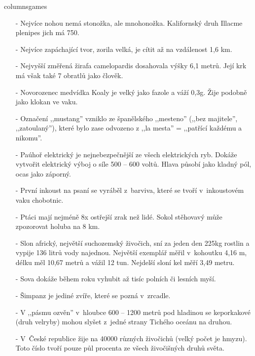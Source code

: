 \begin{multicols}{\value{columnsgames}columnsgames}
\begin{itemize}
\item[-] Nejvíce nohou nemá stonožka, ale mnohonožka. Kalifornský 
druh Illacme plenipes jich má 750.

\item[-] Nejvíce zapáchající tvor, zorila velká, je cítit až na vzdálenost 
1,6 km.

\item[-] Nejvyšší změřená žirafa camelopardis dosahovala výšky 6,1 metrů. 
Její krk má však také 7 obratlů jako člověk.

\item[-] Novorozenec medvídka Koaly je velký jako fazole a váží 0,3g. 
Žije podobně jako klokan ve vaku.

\item[-] Označení ,,mustang'' vzniklo ze španělského ,,mesteno'' (,,bez 
majitele'', ,,zatoulaný''), které bylo zase odvozeno z ,,la mesta'' 
= ,,patřící každému a nikomu''.

\item[-] Paúhoř elektrický je nejnebezpečnější ze všech elektrických ryb. 
Dokáže vytvořit elektrický výboj o síle 500 -- 600 voltů. Hlava 
působí jako kladný pól, ocas jako záporný.

\item[-] První inkoust na psaní se vyráběl z~barviva, které se 
tvoří v~inkoustovém vaku chobotnic.

\item[-] Ptáci mají nejméně 8x ostřejší zrak než lidé. Sokol stěhovavý 
může zpozorovat holuba na 8 km.

\item[-] Slon africký, největší suchozemský živočich, sní za jeden den 
225kg rostlin a vypije 136 litrů vody najednou. Největší exemplář 
měřil v~kohoutku 4,16 m, délku měl 10,67 metrů a vážil 
12 tun. Nejdelší sloní kel měří 3,49 metru.

\item[-] Sova dokáže během roku vyhubit až tisíc polních či lesních myší.

\item[-] Šimpanz je jediné zvíře, které se pozná v~zrcadle.

\item[-] V ,,pásmu ozvěn'' v~hloubce 600 -- 1200 metrů pod hladinou 
se keporkakové (druh velryby) mohou slyšet z~jedné strany 
Tichého oceánu na druhou.

\item[-] V~České republice žije na 40000 různých živočichů (velký 
počet je hmyzu). Toto číslo tvoří pouze půl procenta ze všech 
živočišných druhů světa.


\end{itemize}
\end{multicols}
